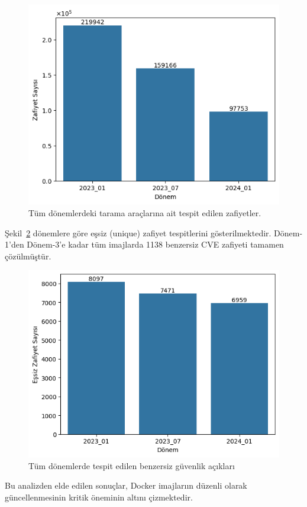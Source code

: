 \begin{figure}[!htbp]
    \centering
    \includegraphics[width=.8\linewidth]{images/s2/detected-vulns-by-period.png}
    \caption{Tüm dönemlerdeki tarama araçlarına ait tespit edilen zafiyetler.}\label{fig:detected-vulns-by-period}
\end{figure}

Şekil~\ref{fig:detected-uniq-vulns-by-period} dönemlere göre eşsiz (unique) zafiyet tespitlerini gösterilmektedir. Dönem-1'den Dönem-3'e kadar tüm imajlarda 1138 benzersiz CVE zafiyeti tamamen çözülmüştür.

\begin{figure}[!htbp]
    \centering
    \includegraphics[width=.8\linewidth]{images/s2/detected-uniq-vulns-by-period.png}
    \caption{Tüm dönemlerde tespit edilen benzersiz güvenlik açıkları}\label{fig:detected-uniq-vulns-by-period}
\end{figure}

Bu analizden elde edilen sonuçlar, Docker imajlarıın düzenli olarak güncellenmesinin kritik öneminin altını çizmektedir.

